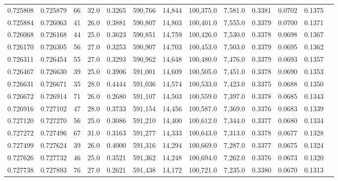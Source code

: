 \begin{tabular}{rrrrrrrrrrrrr}
0.725808 & 0.725879 &    66 & 32.0 &                                     0.3265 & 590,766 &  14,844 & 100,375.0 &   7,581.0 & 0.3381 & 0.0702 & 0.1375 \\
0.725884 & 0.726063 &    41 & 26.0 &                                     0.3881 & 590,807 &  14,803 & 100,401.0 &   7,555.0 & 0.3379 & 0.0700 & 0.1371 \\
0.726068 & 0.726168 &    44 & 25.0 &                                     0.3623 & 590,851 &  14,759 & 100,426.0 &   7,530.0 & 0.3378 & 0.0698 & 0.1367 \\
0.726170 & 0.726305 &    56 & 27.0 &                                     0.3253 & 590,907 &  14,703 & 100,453.0 &   7,503.0 & 0.3379 & 0.0695 & 0.1362 \\
0.726311 & 0.726454 &    55 & 27.0 &                                     0.3293 & 590,962 &  14,648 & 100,480.0 &   7,476.0 & 0.3379 & 0.0693 & 0.1357 \\
0.726467 & 0.726630 &    39 & 25.0 &                                     0.3906 & 591,001 &  14,609 & 100,505.0 &   7,451.0 & 0.3378 & 0.0690 & 0.1353 \\
0.726631 & 0.726671 &    35 & 28.0 &                                     0.4444 & 591,036 &  14,574 & 100,533.0 &   7,423.0 & 0.3375 & 0.0688 & 0.1350 \\
0.726672 & 0.726914 &    71 & 26.0 &                                     0.2680 & 591,107 &  14,503 & 100,559.0 &   7,397.0 & 0.3378 & 0.0685 & 0.1343 \\
0.726916 & 0.727102 &    47 & 28.0 &                                     0.3733 & 591,154 &  14,456 & 100,587.0 &   7,369.0 & 0.3376 & 0.0683 & 0.1339 \\
0.727120 & 0.727270 &    56 & 25.0 &                                     0.3086 & 591,210 &  14,400 & 100,612.0 &   7,344.0 & 0.3377 & 0.0680 & 0.1334 \\
0.727272 & 0.727496 &    67 & 31.0 &                                     0.3163 & 591,277 &  14,333 & 100,643.0 &   7,313.0 & 0.3378 & 0.0677 & 0.1328 \\
0.727499 & 0.727624 &    39 & 26.0 &                                     0.4000 & 591,316 &  14,294 & 100,669.0 &   7,287.0 & 0.3377 & 0.0675 & 0.1324 \\
0.727626 & 0.727732 &    46 & 25.0 &                                     0.3521 & 591,362 &  14,248 & 100,694.0 &   7,262.0 & 0.3376 & 0.0673 & 0.1320 \\
0.727738 & 0.727893 &    76 & 27.0 &                                     0.2621 & 591,438 &  14,172 & 100,721.0 &   7,235.0 & 0.3380 & 0.0670 & 0.1313 \\

\end{tabular}
